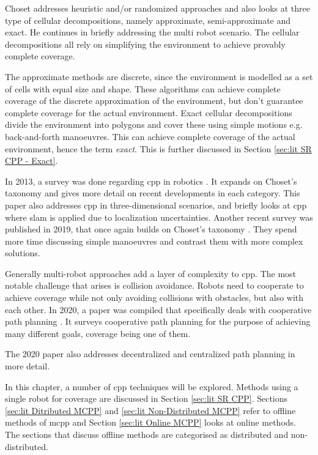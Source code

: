 Choset addresses heuristic and/or randomized approaches and also looks at three type of cellular decompositions, namely approximate, semi-approximate and exact. He continues in briefly addressing the multi robot scenario. The cellular decompositions all rely on simplifying the environment to achieve provably complete coverage. 

The approximate methods are discrete, since the environment is modelled as a set of cells with equal size and shape. These algorithms can achieve complete coverage of the discrete approximation of the environment, but don't guarantee complete coverage for the actual environment. Exact cellular decompositions divide the environment into polygons and cover these using simple motions e.g. back-and-forth manoeuvres. This can achieve complete coverage of the actual environment, hence the term \emph{exact}. This is further discussed in Section \ref{sec:lit SR CPP - Exact}. 

In 2013, a survey was done regarding \acs{cpp} in robotics \cite{CPP-Survey-2013}. It expands on Choset's taxonomy and gives more detail on recent developments in each category. This paper also addresses \acs{cpp} in three-dimensional scenarios, and briefly looks at \acs{cpp} where \acf{slam} is applied due to localization uncertainties. 
Another recent survey was published in 2019, that once again builds on Choset's taxonomy \cite{CPP-Survey-2019}. They spend more time discussing simple manoeuvres and contrast them with more complex solutions.

Generally multi-robot approaches add a layer of complexity to \acs{cpp}. The most notable challenge that arises is collision avoidance. Robots need to cooperate to achieve coverage while not only avoiding collisions with obstacles, but also with each other. In 2020, a paper was compiled that specifically deals with cooperative path planning \cite{Zhang2020}. It surveys cooperative path planning for the purpose of achieving many different goals, coverage being one of them.

The 2020 paper also addresses decentralized and centralized path planning in more detail.

In this chapter, a number of \acs{cpp} techniques will be explored. Methods using a single robot for coverage are discussed in Section \ref{sec:lit SR CPP}. Sections \ref{sec:lit Ditributed MCPP} and \ref{sec:lit Non-Distributed MCPP} refer to offline methods of \acf{mcpp} and Section \ref{sec:lit Online MCPP} looks at online methods. The sections that discuss offline methods are categorised as distributed and non-distributed.

